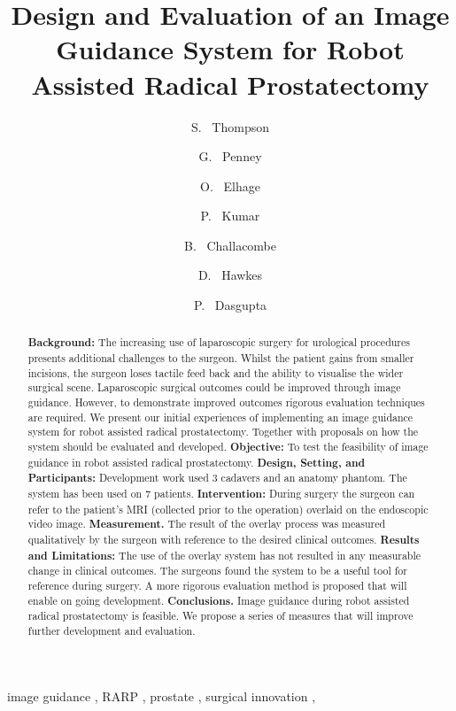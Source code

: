 \documentclass[3p,twocolumn,preprint,10pt]{elsarticle}
\begin{document}
\begin{frontmatter}
\title{Design and Evaluation of an Image Guidance System for Robot Assisted Radical Prostatectomy}
\author[cmic]{S. ~Thompson}
\author[kings]{G. ~Penney}
\author[Guys]{O. ~Elhage}
\author[Guys]{P. ~Kumar}
\author[Guys]{B. ~Challacombe}
\author[cmic]{D. ~Hawkes}
\author[Guys]{P. ~Dasgupta}
\address[cmic]{Centre for Medical Image Computing, UCL, London WC1E 6DP, UK}
\address[kings]{Interdisciplinary Medical Imaging Group, Kings College London, London, UK}
\address[Guys]{MRC Centre for Transplantation, NHIR Biomedical Research Centre, King's Health Partners, Guy's Hospital, London, UK}
\begin{abstract}
{\bf Background:}
The increasing use of laparoscopic surgery for urological procedures presents
additional challenges to the surgeon. Whilst the patient gains from smaller
incisions, the surgeon loses tactile feed back and the ability to 
visualise the wider surgical scene.  
Laparoscopic surgical outcomes could be improved through image guidance. 
However, to demonstrate improved outcomes rigorous evaluation techniques are
required.
We present our initial experiences of implementing an image guidance 
system for robot assisted radical prostatectomy. Together with proposals on
how the system should be evaluated and developed.\newline
{\bf Objective:}
To test the feasibility of image guidance in robot assisted radical 
prostatectomy. \newline
{\bf Design, Setting, and Participants:}
Development work used 3 cadavers and an anatomy phantom.
The system has been used on 7 patients.  \newline
{\bf Intervention:}
During surgery the surgeon can refer to the patient's MRI (collected prior to the
operation) overlaid on the endoscopic video image. \newline
{\bf Measurement.}
The result of the overlay process was measured qualitatively by the surgeon with 
reference to the desired clinical outcomes. \newline
{\bf Results and Limitations:}
The use of the overlay system has not resulted in any measurable change in clinical 
outcomes. The surgeons found the system to be a useful tool for reference during 
surgery. A more rigorous evaluation method is proposed that will enable on going development.\newline
{\bf Conclusions.}
Image guidance during robot assisted radical prostatectomy is feasible. We 
propose a series of measures that will improve further development and evaluation. \newline
\end{abstract}
\begin{keyword}
image guidance \sep
RARP \sep
prostate \sep
surgical innovation \sep
\end{keyword}
\end{frontmatter}


\end{document}
